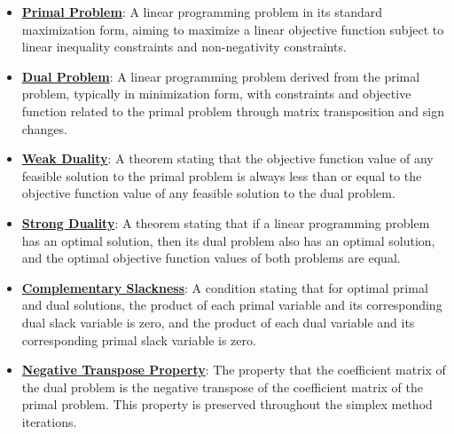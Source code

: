 \documentclass{article}%
\begin{document}
\begin{itemize}[leftmargin=*]%
\item \href{https://www.math.purdue.edu/~yipn/421//2024-09-12-Duality.pdf#page=1}{\textbf{Primal Problem}}: A linear programming problem in its standard maximization form, aiming to maximize a linear objective function subject to linear inequality constraints and non-negativity constraints.%
\item \href{https://www.math.purdue.edu/~yipn/421//2024-09-12-Duality.pdf#page=1}{\textbf{Dual Problem}}: A linear programming problem derived from the primal problem, typically in minimization form, with constraints and objective function related to the primal problem through matrix transposition and sign changes.%
\item \href{https://www.math.purdue.edu/~yipn/421//2024-09-12-Duality.pdf#page=2}{\textbf{Weak Duality}}: A theorem stating that the objective function value of any feasible solution to the primal problem is always less than or equal to the objective function value of any feasible solution to the dual problem.%
\item \href{https://www.math.purdue.edu/~yipn/421//2024-09-12-Duality.pdf#page=11}{\textbf{Strong Duality}}: A theorem stating that if a linear programming problem has an optimal solution, then its dual problem also has an optimal solution, and the optimal objective function values of both problems are equal.%
\item \href{https://www.math.purdue.edu/~yipn/421//2024-09-12-Duality.pdf#page=5}{\textbf{Complementary Slackness}}: A condition stating that for optimal primal and dual solutions, the product of each primal variable and its corresponding dual slack variable is zero, and the product of each dual variable and its corresponding primal slack variable is zero.%
\item \href{https://www.math.purdue.edu/~yipn/421//2024-09-12-Duality.pdf#page=6}{\textbf{Negative Transpose Property}}: The property that the coefficient matrix of the dual problem is the negative transpose of the coefficient matrix of the primal problem. This property is preserved throughout the simplex method iterations.%
\end{itemize}%
\end{document}
